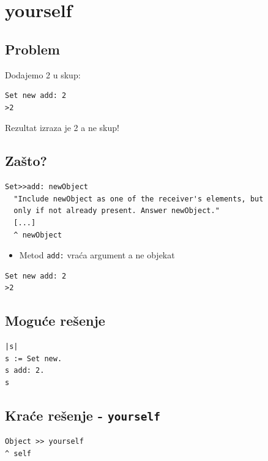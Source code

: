 \documentclass[presentation]{beamer}
\begin{document}
\section{yourself}
\label{sec:org97badb0}
\subsection{Problem}
\label{sec:org8105182}

Dodajemo 2 u skup:

\begin{verbatim}
Set new add: 2
>2
\end{verbatim}

Rezultat izraza je 2 a ne skup!

\subsection{Zašto?}
\label{sec:orgba27597}

\begin{verbatim}
Set>>add: newObject
  "Include newObject as one of the receiver's elements, but
  only if not already present. Answer newObject."
  [...]
  ^ newObject
\end{verbatim}

\begin{itemize}
\item Metod \texttt{add:} vraća argument a ne objekat
\end{itemize}

\begin{verbatim}
Set new add: 2
>2
\end{verbatim}

\subsection{Moguće rešenje}
\label{sec:org5b112a2}

\begin{verbatim}
|s|
s := Set new.
s add: 2.
s
\end{verbatim}

\subsection{Kraće rešenje - \texttt{yourself}}
\label{sec:org8ec7070}

\begin{verbatim}
Object >> yourself
^ self
\end{verbatim}
\end{document}

